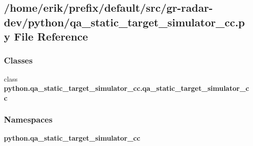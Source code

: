 \subsection{/home/erik/prefix/default/src/gr-\/radar-\/dev/python/qa\+\_\+static\+\_\+target\+\_\+simulator\+\_\+cc.py File Reference}
\label{qa__static__target__simulator__cc_8py}
\subsubsection*{Classes}
\begin{DoxyCompactItemize}
\item 
class {\bf python.\+qa\+\_\+static\+\_\+target\+\_\+simulator\+\_\+cc.\+qa\+\_\+static\+\_\+target\+\_\+simulator\+\_\+cc}
\end{DoxyCompactItemize}
\subsubsection*{Namespaces}
\begin{DoxyCompactItemize}
\item 
 {\bf python.\+qa\+\_\+static\+\_\+target\+\_\+simulator\+\_\+cc}
\end{DoxyCompactItemize}
